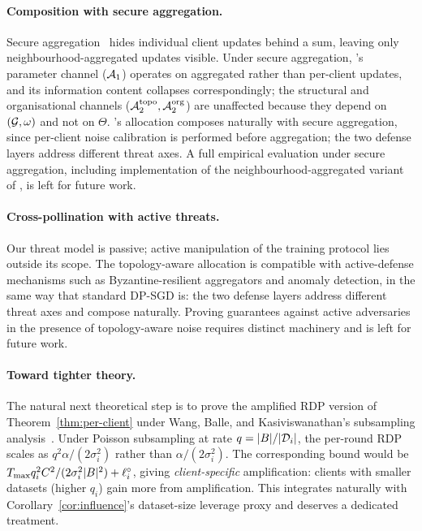 \paragraph{Composition with secure aggregation.}
Secure aggregation~\cite{bonawitz2017secagg} hides individual client
updates behind a sum, leaving only neighbourhood-aggregated updates
visible. Under secure aggregation, \TADI's parameter channel
($\mathcal{A}_1$) operates on aggregated rather than per-client updates, and
its information content collapses correspondingly; the structural and
organisational channels ($\mathcal{A}_2^{\text{topo}}, \mathcal{A}_2^{\text{org}}$)
are unaffected because they depend on $(\mathcal{G},\omega)$ and not on
$\Theta$. \Fulcrum's allocation composes naturally with secure
aggregation, since per-client noise calibration is performed before
aggregation; the two defense layers address different threat axes.
A full empirical evaluation under secure aggregation, including
implementation of the neighbourhood-aggregated variant of \TADI,
is left for future work.

\paragraph{Cross-pollination with active threats.}
Our threat model is passive; active manipulation of the training
protocol lies outside its scope. The topology-aware allocation is
compatible with active-defense mechanisms such as Byzantine-resilient
aggregators and anomaly detection, in the same way that standard
DP-SGD is: the two defense layers address different threat axes and
compose naturally. Proving guarantees against active adversaries in
the presence of topology-aware noise requires distinct machinery and
is left for future work.

\paragraph{Toward tighter theory.}
The natural next theoretical step is to prove the amplified RDP version
of Theorem~\ref{thm:per-client} under Wang, Balle, and
Kasiviswanathan's subsampling analysis~\cite{wang2019subsampled}. Under
Poisson subsampling at rate $q = |B|/|\mathcal{D}_i|$, the per-round RDP
scales as $q^2 \alpha/(2\sigma_i^2)$ rather than $\alpha/(2\sigma_i^2)$.
The corresponding bound would be
\(T_{\max} q_i^2 C^2 / (2\sigma_i^2 |B|^2) + \ell_i^\circ\), giving
\emph{client-specific} amplification: clients with smaller datasets
(higher $q_i$) gain more from amplification. This integrates naturally
with Corollary~\ref{cor:influence}'s dataset-size leverage proxy and
deserves a dedicated treatment.
